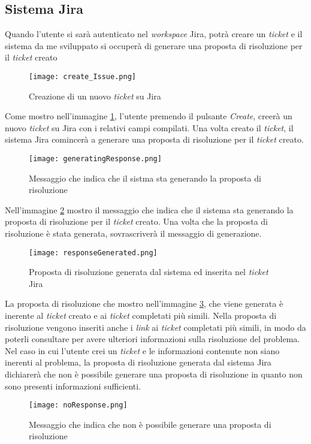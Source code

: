 \subsection*{Sistema Jira}
Quando l'utente si sarà autenticato nel \textit{workspace} Jira, potrà creare un \textit{ticket} e il sistema da me sviluppato si occuperà di generare una proposta di risoluzione per il \textit{ticket} creato
\begin{figure}[H]
    \centering
    \texttt{[image: create\_Issue.png]}
    \caption{Creazione di un nuovo \textit{ticket} su Jira} 
    \label{fig:creazioneTicket}
\end{figure}
\noindent
Come mostro nell'immagine \ref{fig:creazioneTicket}, l'utente premendo il pulsante \textit{Create}, creerà un nuovo \textit{ticket} su Jira con i relativi campi compilati. Una volta creato il \textit{ticket}, il sistema Jira comincerà a generare una proposta di risoluzione per il \textit{ticket} creato.
\begin{figure}[H]
    \centering
    \texttt{[image: generatingResponse.png]}
    \caption{Messaggio che indica che il sistma sta generando la proposta di risoluzione} 
    \label{fig:generatingResponse}
\end{figure}
\noindent
Nell'immagine \ref{fig:generatingResponse} mostro il messaggio che indica che il sistema sta generando la proposta di risoluzione per il \textit{ticket} creato. Una volta che la proposta di risoluzione è stata generata, sovrascriverà il messaggio di generazione.
\begin{figure}[H]
    \centering
    \texttt{[image: responseGenerated.png]}
    \caption{Proposta di risoluzione generata dal sistema ed inserita nel \textit{ticket} Jira}
    \label{fig:responseGenerated}
\end{figure}
\noindent
La proposta di risoluzione che mostro nell'immagine \ref{fig:responseGenerated}, che viene generata è inerente al \textit{ticket} creato e ai \textit{ticket} completati più simili. Nella proposta di risoluzione vengono inseriti anche i \textit{link} ai \textit{ticket} completati più simili, in modo da poterli consultare per avere ulteriori informazioni sulla risoluzione del problema.
Nel caso in cui l'utente crei un \textit{ticket} e le informazioni contenute non siano inerenti al problema, la proposta di risoluzione generata dal sistema Jira dichiarerà che non è possibile generare una proposta di risoluzione in quanto non sono presenti informazioni sufficienti.
\begin{figure}[H]
    \centering
    \texttt{[image: noResponse.png]}
    \caption{Messaggio che indica che non è possibile generare una proposta di risoluzione}
    \label{fig:noResponse}
\end{figure}
